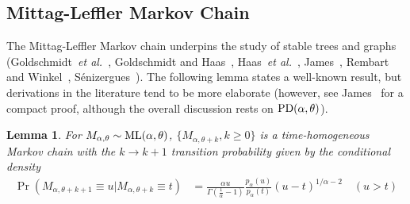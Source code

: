 \documentclass[a4paper,12pt]{article}
\newtheorem{lemma}{Lemma}
\begin{document}
{{\subsection{Mittag-Leffler Markov Chain}
\label{sec:MLMC}

The Mittag-Leffler Markov chain  underpins the study of stable trees and graphs 
(Goldschmidt~{\it  et al.}~\cite{Goldschmidt22}, Goldschmidt and Haas~\cite{GoldschmidtHaas},  Haas~{\it  et al.}~\cite{Haas}, James~\cite{James2015}, Rembart and Winkel~\cite{RembartWinkel2018, RembartWinkel2023}, S\'{e}nizergues~\cite{Senizergues}). 
The following lemma states a  well-known result, but derivations  in the literature tend to be more elaborate
(however, see James~\cite[Proposition~3.1]{James2015} for a compact proof,  although the overall 
 discussion  rests on ${\rm PD}(\alpha,\theta)$).
\begin{lemma}
\label{lem:MLMC}
For  $M_{\alpha,\theta}\sim{\rm ML}(\alpha,\theta)$, $\{M_{\alpha,\theta+k}, k\ge0\}$ is a time-homogeneous  Markov chain 
with the  $k\to k+1$ transition probability given by the conditional density
\begin{align}
\Pr(M_{\alpha,\theta+k+1}\equiv u \vert  M_{\alpha,\theta+k}\equiv t)
&=  \frac{\alpha u}{\Gamma\left(\tfrac{1}{\alpha}-1\right)} \frac{p_\alpha(u)}{p_\alpha(t)} (u-t)^{1/\alpha-2} \quad (u>t)
\label{eq:MLMC}
\end{align}
\end{lemma}

}}
\end{document}
